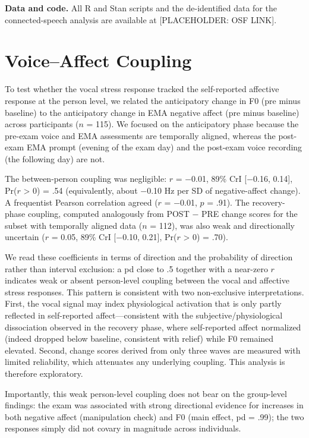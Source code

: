 \documentclass[
  english,
  man,floatsintext]{apa6}
\begin{document}
\textbf{Data and code.} All R and Stan scripts and the de-identified data for the connected-speech analysis are available at {[}PLACEHOLDER: OSF LINK{]}.

\newpage

\section{Voice--Affect Coupling}\label{voiceaffect-coupling}

To test whether the vocal stress response tracked the self-reported affective response at the person level, we related the anticipatory change in F0 (pre minus baseline) to the anticipatory change in EMA negative affect (pre minus baseline) across participants (\(n\) = 115). We focused on the anticipatory phase because the pre-exam voice and EMA assessments are temporally aligned, whereas the post-exam EMA prompt (evening of the exam day) and the post-exam voice recording (the following day) are not.

The between-person coupling was negligible: \(r\) = −0.01, 89\% CrI {[}−0.16, 0.14{]}, Pr(\(r\) \textgreater{} 0) = .54 (equivalently, about −0.10 Hz per SD of negative-affect change). A frequentist Pearson correlation agreed (\(r\) = −0.01, \(p\) = .91). The recovery-phase coupling, computed analogously from POST − PRE change scores for the subset with temporally aligned data (\(n\) = 112), was also weak and directionally uncertain (\(r\) = 0.05, 89\% CrI {[}−0.10, 0.21{]}, Pr(\(r\) \textgreater{} 0) = .70).

We read these coefficients in terms of direction and the probability of direction rather than interval exclusion: a pd close to .5 together with a near-zero \(r\) indicates weak or absent person-level coupling between the vocal and affective stress responses. This pattern is consistent with two non-exclusive interpretations. First, the vocal signal may index physiological activation that is only partly reflected in self-reported affect---consistent with the subjective/physiological dissociation observed in the recovery phase, where self-reported affect normalized (indeed dropped below baseline, consistent with relief) while F0 remained elevated. Second, change scores derived from only three waves are measured with limited reliability, which attenuates any underlying coupling. This analysis is therefore exploratory.

Importantly, this weak person-level coupling does not bear on the group-level findings: the exam was associated with strong directional evidence for increases in both negative affect (manipulation check) and F0 (main effect, pd = .99); the two responses simply did not covary in magnitude across individuals.
\end{document}
